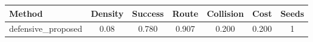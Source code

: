 \begin{tabular}{lcccccc}
\toprule
Method & Density & Success & Route & Collision & Cost & Seeds \\ 
\midrule
defensive_proposed & 0.08 & 0.780 & 0.907 & 0.200 & 0.200 & 1 \\ 
\bottomrule
\end{tabular}
